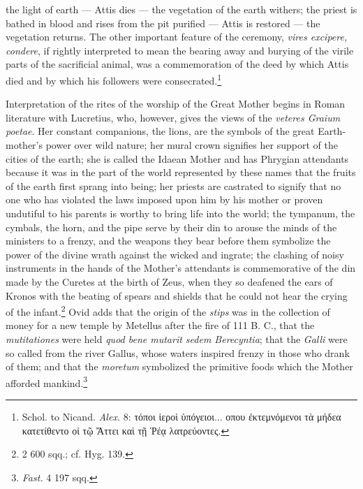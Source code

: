 \documentclass[a4paper, 11pt, oneside, polutonikogreek, english]{article}
\begin{document}
the light of earth --- Attis dies --- the vegetation of the earth withers; the priest is bathed in blood and rises from the pit purified --- Attis is restored --- the vegetation returns. The other important feature of the ceremony, \emph{vires excipere, condere}, if rightly interpreted to mean the bearing away and burying of the virile parts of the sacrificial animal, was a commemoration of the deed by which Attis died and by which his followers were consecrated.\footnote{Schol. to Nicand. \emph{Alex.} 8: τόποι ἱεροὶ ὑπόγειοι... οπου ἐκτεμνόμενοι τὰ μήδεα κατετίθεντο οἱ τῷ Ἄττει καὶ τῇ Ῥέᾳ λατρεύοντες.}

Interpretation of the rites of the worship of the Great Mother begins in Roman literature with Lucretius, who, however, gives the views of the \emph{veteres Graium poetae}. Her constant companions, the lions, are the symbols of the great Earth-mother's power over wild nature; her mural crown signifies her support of the cities of the earth; she is called the Idaean Mother and has Phrygian attendants because it was in the part of the world represented by these names that the fruits of the earth first sprang into being; her priests are castrated to signify that no one who has violated the laws imposed upon him by his mother or proven undutiful to his parents is worthy to bring life into the world; the tympanum, the cymbals, the horn, and the pipe serve by their din to arouse the minds of the ministers to a frenzy, and the weapons they bear before them symbolize the power of the divine wrath against the wicked and ingrate; the clashing of noisy instruments in the hands of the Mother's attendants is commemorative of the din made by the Curetes at the birth of Zeus, when they so deafened the ears of Kronos with the beating of spears and shields that he could not hear the crying of the infant.\footnote{2 600 sqq.; cf. Hyg. 139.} Ovid adds that the origin of the \emph{stips} was in the collection of money for a new temple by Metellus after the fire of 111 B. C., that the \emph{mutitationes} were held \emph{quod bene mutarit sedem Berecyntia}; that the \emph{Galli} were so called from the river Gallus, whose waters inspired frenzy in those who drank of them; and that the \emph{moretum} symbolized the primitive foods which the Mother afforded mankind.\footnote{\emph{Fast.} 4 197 sqq.}
\end{document}
